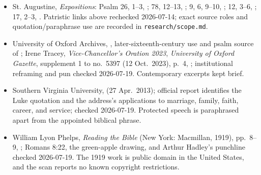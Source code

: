 \begin{deepstudy}
{\begin{itemize}[itemsep=0em,topsep=0.15em,parsep=0pt]
\item St. Augustine, \emph{Expositions}: Psalm 26, 1--3, ; 78, 12--13, ; 9, 6, 9--10, ; 12, 3--6, ; 17, 2--3, . Patristic links above rechecked 2026-07-14; exact source roles and quotation/paraphrase use are recorded in \texttt{research/scope.md}.
\item University of Oxford Archives, , later-sixteenth-century use and psalm source of ; Irene Tracey, \emph{Vice-Chancellor's Oration 2023}, \emph{University of Oxford Gazette}, supplement 1 to no.~5397 (12 Oct.~2023), p.~4, ; institutional reframing and  pun checked 2026-07-19. Contemporary excerpts kept brief.
\item Southern Virginia University,  (27 Apr.~2013); official report identifies the Luke quotation and the address's applications to marriage, family, faith, career, and service; checked 2026-07-19. Protected speech is paraphrased apart from the appointed biblical phrase.
\item William Lyon Phelps, \emph{Reading the Bible} (New York: Macmillan, 1919), pp.~8--9, ; Romans 8:22, the green-apple drawing, and Arthur Hadley's punchline checked 2026-07-19. The 1919 work is public domain in the United States, and the scan reports no known copyright restrictions.
\end{itemize}
}


\end{deepstudy}

